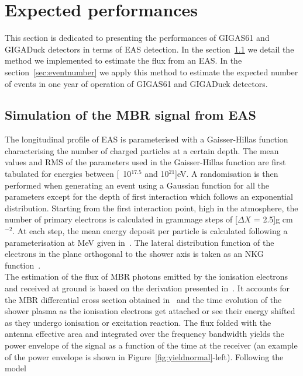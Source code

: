 \section{Expected performances}
\label{sec:simulation}
This  section   is  dedicated   to  presenting  the   performances  of
\mbox{GIGAS61} and  GIGADuck detectors in terms of  EAS detection.  In
the section~\ref{sec:mbrsim}  we detail  the method we  implemented to
estimate the  flux from an EAS.   In the section~\ref{sec:eventnumber}
we apply this method to estimate  the expected number of events in one
year of operation of \mbox{GIGAS61} and GIGADuck detectors.
\subsection{Simulation of the MBR signal from EAS}
\label{sec:mbrsim} 
The longitudinal profile of EAS is parameterised with a Gaisser-Hillas
function~\cite{gh} characterising the number of charged particles at a
certain depth.  The mean values and  RMS of the parameters used in the
Gaisser-Hillas  function  are  first  tabulated for  energies  between
\unit[10$^{17.5}$  and   10$^{21}$]{eV}.   A  randomisation   is  then
performed when generating  an event using a Gaussian  function for all
the parameters except for the depth of first interaction which follows
an  exponential  distribution.  Starting  from  the first  interaction
point,  high in  the atmosphere,  the number  of primary  electrons is
calculated in grammage steps  of \unit[$\Delta X$ = 2.5]{g cm$^{-2}$}.
At  each step,  the mean  energy  deposit per  particle is  calculated
following a parameterisation at \unit[1]{MeV} given in~\cite{nerling}.
The  lateral  distribution function  of  the  electrons  in the  plane
orthogonal to the shower axis  is taken as an NKG function~\cite{nkg1,
  nkg2}.\\The estimation  of the  flux of MBR  photons emitted  by the
ionisation electrons and received at ground is based on the derivation
presented  in~\cite{imen2016}.  It accounts  for the  MBR differential
cross section obtained in~\cite{MBRXsec} and the time evolution of the
shower plasma  as the ionisation  electrons get attached or  see their
energy shifted as they undergo ionisation or excitation reaction.  The
flux folded  with the antenna  effective area and integrated  over the
frequency  bandwidth yields  the power  envelope  of the  signal as  a
function of the time at the receiver (an example of the power envelope
is shown  in Figure~\ref{fig:yieldnormal}-left).  Following  the model
